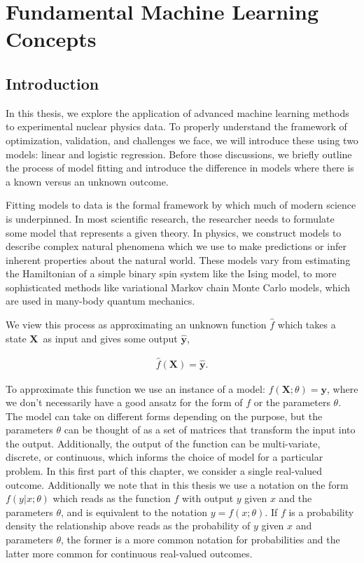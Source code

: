 \chapter{Fundamental Machine Learning Concepts}\label{chap:fundament}
\section{Introduction}\label{sec:fundament_intro}

In this thesis, we explore the application of advanced machine learning methods to experimental nuclear physics data. To properly understand the framework of optimization, validation, and challenges we face, we will introduce these using two models: linear and logistic regression. Before those discussions, we briefly outline the process of model fitting and introduce the difference in models where there is a known versus an unknown outcome.

Fitting models to data is the formal framework by which much of modern science is underpinned. In most scientific research, the researcher needs to formulate some model that represents a given theory. In physics, we construct models to describe complex natural phenomena which we use to make predictions or infer inherent properties about the natural world. These models vary from estimating the Hamiltonian of a simple binary spin system like the Ising model, to more sophisticated methods like variational Markov chain Monte Carlo models, which are used in many-body quantum mechanics.

We view this process as approximating an unknown function $\hat{f}$ which takes a state $\mathbf{X}$ as input and gives some output $\mathbf{\hat{y}}$,  
 
 \begin{align}
 \hat{f}(\mathbf{X}) = \mathbf{\hat{y}}.
 \end{align}

\noindent To approximate this function we use an instance of a model: $f(\mathbf{X}; \theta) = \mathbf{y}$, where we don't necessarily have a good ansatz for the form of $f$ or the parameters $\theta$. The model can take on different forms depending on the purpose, but the parameters $\theta$ can be thought of as a set of matrices that transform the input into the output. Additionally, the output of the function can be multi-variate, discrete, or continuous, which informs the choice of model for a particular problem. In this first part of this chapter, we consider a single real-valued outcome. Additionally we note  that in this thesis we use a notation on the form $f(y | x; \theta )$ which reads as the function $f$ with output $y$ given $x$ and the parameters $\theta$, and is equivalent to the notation $y = f(x; \theta)$. If $f$ is a probability density the relationship above reads as the probability of $y$ given $x$ and parameters $\theta$, the former is a more common notation for probabilities and the latter more common for continuous real-valued outcomes. 

